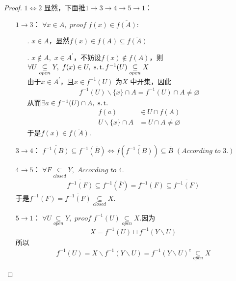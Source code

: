 	\begin{proof}
		$1 \Leftrightarrow 2$ 显然，下面推$1 \rightarrow 3 \rightarrow 4 \rightarrow 5 \rightarrow 1$：
		\begin{enumerate}
			\item[$1 \rightarrow 3$：]$\forall x \in A , \,\, proof \,\, f(x) \in \overline{f(A)}$:
			\begin{enumerate}
				\item[\uppercase\expandafter{\romannumeral1}.] $x \in A$，显然$f(x) \in f(A) \subseteq \overline{f(A)}$ 
				
				\item[\uppercase\expandafter{\romannumeral2}.] $x \notin A , \,\, x \in A^{'}$，不妨设$f(x) \notin f(A)$，则\\
				$\forall U \underset{open}{\subseteq} Y , \,\, f(x) \in U , \,\, \operatorname{s.t.} f^{-1}(U) \underset{open}{\subseteq} X$\\
				由于$x \in A^{'}$，且$x \in f^{-1}(U)$ 为$X$ 中开集，因此
				\begin{align}
					f^{-1}(U) \backslash \{ x \} \cap A = f^{-1}(U) \cap A \neq \varnothing
				\end{align}
				从而$\exists a \in f^{-1}(U) \cap A , \,\, \operatorname{s.t.}$
				\begin{align}
					f(a) &\in U \cap f(A)\\
					U \backslash \{ x \} \cap A &= U \cap A \neq \varnothing
				\end{align}
				于是$f(x) \in \overline{f(A)}$.
			\end{enumerate}
		
			\item[$3 \rightarrow 4$：]$\overline{f^{-1}(B)} \subseteq f^{-1}(\overline{B}) \Leftrightarrow f(\overline{f^{-1}(B)}) \subseteq \overline{B} \,\, (According \,\, to \,\, 3.)$
			
			\item[$4 \rightarrow 5$：]$\forall F \underset{closed}{\subseteq} Y , \,\, According \,\, to \,\, 4.$
			\begin{align}
				\overline{f^{-1}(F)} \subseteq f^{-1}(\overline{F}) = f^{-1}(F) \subseteq \overline{f^{-1}(F)}
			\end{align}
			于是$f^{-1}(F) = \overline{f^{-1}(F)} \underset{closed}{\subseteq} X$.
			
			\item[$5 \rightarrow 1$：]$\forall U \underset{open}{\subseteq} Y , \,\, proof \,\, f^{-1}(U) \underset{open}{\subseteq} X$.因为
			\begin{align}
				X = f^{-1}(U) \sqcup f^{-1}(Y \backslash U)
			\end{align}
			所以
			\begin{align}
				f^{-1}(U) = X \backslash f^{-1}(Y \backslash U) = f^{-1}(Y \backslash U)^{c} \underset{open}{\subseteq} X
			\end{align}
		\end{enumerate}
	\end{proof}

